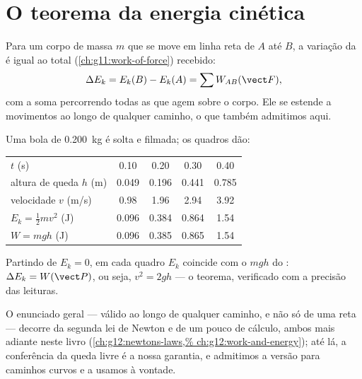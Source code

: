\section{O teorema da energia cinética}

\begin{theorem}\label{thm:g11:mechanical-energy:ketheorem}
Para um corpo de massa $m$ que se move em linha reta de $A$ até $B$, a
variação da  é igual ao  total
(\cref{ch:g11:work-of-force}) recebido:
\[
\Delta E_k = E_k(B) - E_k(A) = \sum W_{AB}(\vect F),
\]
com a soma percorrendo todas as  que agem sobre o corpo. Ele se
estende a movimentos ao longo de qualquer caminho, o que também
admitimos aqui.
\end{theorem}
\admitted

\begin{example}\label{ex:g11:mechanical-energy:freefall}
Uma bola de \qty{0.200}{kg} é solta e filmada; os quadros dão:
\begin{center}\small
\begin{tabular}{lcccc}
$t$ (\unit{s}) & 0.10 & 0.20 & 0.30 & 0.40\\
altura de queda $h$ (\unit{m}) & 0.049 & 0.196 & 0.441 & 0.785\\
velocidade $v$ (\unit{m/s}) & 0.98 & 1.96 & 2.94 & 3.92\\
$E_k = \tfrac12 mv^2$ (\unit{J}) & 0.096 & 0.384 & 0.864 & 1.54\\
$W = mgh$ (\unit{J}) & 0.096 & 0.385 & 0.865 & 1.54
\end{tabular}
\end{center}
Partindo de $E_k = 0$, em cada quadro $E_k$ coincide com o 
$mgh$ do : $\Delta E_k = W(\vect P)$, ou seja, $v^2 = 2gh$ --- o
teorema, verificado com a precisão das leituras.
\end{example}

\begin{remark}\label{rem:g11:mechanical-energy:proof}
O enunciado geral --- válido ao longo de qualquer caminho, e não só de
uma reta --- decorre da segunda lei de Newton e de um pouco de cálculo,
ambos mais adiante neste livro (\cref{ch:g12:newtons-laws,%
ch:g12:work-and-energy}); até lá, a conferência da queda livre é a nossa
garantia, e admitimos a versão para caminhos curvos e a usamos à
vontade.
\end{remark}

